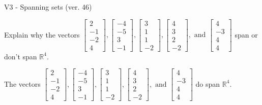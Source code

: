 \begin{exercise}
  \begin{exerciseTitle}V3 - Spanning sets (ver. 46)\end{exerciseTitle}
  \begin{exerciseStatement}
    Explain why the vectors \(\left[\begin{array}{r}
2 \\
-1 \\
-2 \\
4
\end{array}\right] , \left[\begin{array}{r}
-4 \\
-5 \\
3 \\
-1
\end{array}\right] , \left[\begin{array}{r}
3 \\
1 \\
1 \\
-2
\end{array}\right] , \left[\begin{array}{r}
4 \\
3 \\
2 \\
-2
\end{array}\right] , \text{ and } \left[\begin{array}{r}
4 \\
-3 \\
4 \\
4
\end{array}\right]\) span or don't span \(\mathbb{R}^4\). 
	


  \end{exerciseStatement}
  \begin{exerciseAnswer}
   The vectors \(\left[\begin{array}{r}
2 \\
-1 \\
-2 \\
4
\end{array}\right] , \left[\begin{array}{r}
-4 \\
-5 \\
3 \\
-1
\end{array}\right] , \left[\begin{array}{r}
3 \\
1 \\
1 \\
-2
\end{array}\right] , \left[\begin{array}{r}
4 \\
3 \\
2 \\
-2
\end{array}\right] , \text{ and } \left[\begin{array}{r}
4 \\
-3 \\
4 \\
4
\end{array}\right]\) 
  	 do  
	span \(\mathbb{R}^4\).
  



\end{exerciseAnswer}
\end{exercise}
